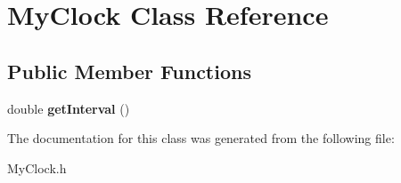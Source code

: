 \section{MyClock Class Reference}
\label{classMyClock}
\subsection*{Public Member Functions}
\begin{DoxyCompactItemize}
\item 
double {\bfseries getInterval} ()\label{classMyClock_aee7eb1b57a55a03384bbd0b4c7280ed4}

\end{DoxyCompactItemize}


The documentation for this class was generated from the following file:\begin{DoxyCompactItemize}
\item 
MyClock.h\end{DoxyCompactItemize}
